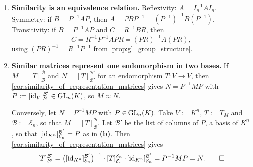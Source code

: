 \begin{exercisesolution}
\begin{enumerate}[label=\textbf{(\alph*)}]
    \item \textbf{Similarity is an equivalence relation.} Reflexivity: $A = I_n^{-1} A I_n$. Symmetry: if $B = P^{-1}AP$, then $A = P B P^{-1} = (P^{-1})^{-1} B (P^{-1})$. Transitivity: if $B = P^{-1}AP$ and $C = R^{-1}BR$, then
    \[
    C = R^{-1} P^{-1} A P R = (PR)^{-1} A (PR),
    \]
    using $(PR)^{-1} = R^{-1}P^{-1}$ from \cref{prop:gl_group_structure}.

    \item \textbf{Similar matrices represent one endomorphism in two bases.} If $M = [T]_{\mathcal{B}}^{\mathcal{B}}$ and $N = [T]_{\mathcal{B}'}^{\mathcal{B}'}$ for an endomorphism $T: V \to V$, then \cref{cor:similarity_of_representation_matrices} gives $N = P^{-1} M P$ with $P := [\operatorname{id}_V]_{\mathcal{B}}^{\mathcal{B}'} \in \operatorname{GL}_n(K)$, so $M \approx N$.

    Conversely, let $N = P^{-1} M P$ with $P \in \operatorname{GL}_n(K)$. Take $V := K^n$, $T := T_M$ and $\mathcal{B} := \mathcal{E}_n$, so that $M = [T]_{\mathcal{B}}^{\mathcal{B}}$. Let $\mathcal{B}'$ be the list of columns of $P$, a basis of $K^n$, so that $[\operatorname{id}_{K^n}]_{\mathcal{E}_n}^{\mathcal{B}'} = P$ as in \textbf{(b)}. Then \cref{cor:similarity_of_representation_matrices} gives
    \[
    [T]_{\mathcal{B}'}^{\mathcal{B}'} = \big([\operatorname{id}_{K^n}]_{\mathcal{E}_n}^{\mathcal{B}'}\big)^{-1} \cdot [T]_{\mathcal{E}_n}^{\mathcal{E}_n} \cdot [\operatorname{id}_{K^n}]_{\mathcal{E}_n}^{\mathcal{B}'} = P^{-1} M P = N. \qedhere
    \]
\end{enumerate}
\end{exercisesolution}



